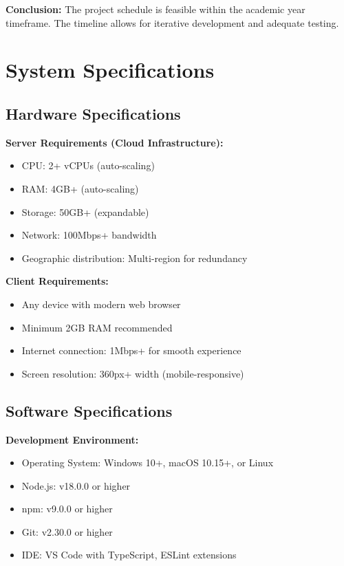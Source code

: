 \textbf{Conclusion:} The project schedule is feasible within the academic year timeframe. The timeline allows for iterative development and adequate testing.

\section{System Specifications}

\subsection{Hardware Specifications}

\textbf{Server Requirements (Cloud Infrastructure):}
\begin{itemize}
\item CPU: 2+ vCPUs (auto-scaling)
\item RAM: 4GB+ (auto-scaling)
\item Storage: 50GB+ (expandable)
\item Network: 100Mbps+ bandwidth
\item Geographic distribution: Multi-region for redundancy
\end{itemize}

\textbf{Client Requirements:}
\begin{itemize}
\item Any device with modern web browser
\item Minimum 2GB RAM recommended
\item Internet connection: 1Mbps+ for smooth experience
\item Screen resolution: 360px+ width (mobile-responsive)
\end{itemize}

\subsection{Software Specifications}

\textbf{Development Environment:}
\begin{itemize}
\item Operating System: Windows 10+, macOS 10.15+, or Linux
\item Node.js: v18.0.0 or higher
\item npm: v9.0.0 or higher
\item Git: v2.30.0 or higher
\item IDE: VS Code with TypeScript, ESLint extensions
\end{itemize}

